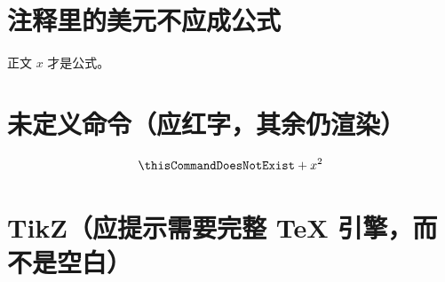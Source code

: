 \documentclass{silkmath-fixture}
\begin{document}
\section{注释里的美元不应成公式}

正文 $x$ 才是公式。

\section{未定义命令（应红字，其余仍渲染）}

\[
  \thisCommandDoesNotExist + x^2
\]

\section{TikZ（应提示需要完整 TeX 引擎，而不是空白）}

\end{document}
